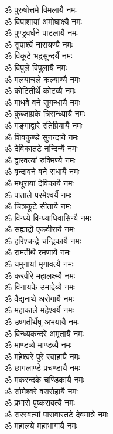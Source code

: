 \begin{multicols}{2}
\begin{flushleft}
ॐ पुरुषोत्तमे विमलायै नमः\\
ॐ विपाशायां अमोघाक्ष्यै नमः\\
ॐ पुण्ड्रवर्धने पाटलायै नमः\\
ॐ सुपार्श्वे नारायण्यै नमः\\
ॐ विकूटे भद्रसुन्दर्यै नमः\hfill{}\\
ॐ विपुले विपुलायै नमः\\
ॐ मलयाचले कल्याण्यै नमः\\
ॐ कोटितीर्थे कोटव्यै नमः\\
ॐ माधवे वने सुगन्धायै नमः\\
ॐ कुब्जाम्रके त्रिसन्ध्यायै नमः\\
ॐ गङ्गाद्वारे रतिप्रियायै नमः\\
ॐ शिवकुण्डे सुनन्दायै नमः\\
ॐ देविकातटे नन्दिन्यै नमः\\
ॐ द्वारवत्यां रुक्मिण्यै नमः\\
ॐ वृन्दावने वने राधायै नमः\hfill{}\\
ॐ मथूरायां देविकायै नमः\\
ॐ पाताले परमेश्वर्यै नमः\\
ॐ चित्रकूटे सीतायै नमः\\
ॐ विन्ध्ये विन्ध्याधिवासिन्यै नमः\\
ॐ सह्याद्रौ एकवीरायै नमः\\
ॐ हरिश्चन्द्रे चन्द्रिकायै नमः\\
ॐ रामतीर्थे रमणायै नमः\\
ॐ यमुनायां मृगावत्यै नमः\\
ॐ करवीरे महालक्ष्म्यै नमः\\
ॐ विनायके उमादेव्यै नमः\hfill{}\\
ॐ वैद्यनाथे अरोगायै नमः\\
ॐ महाकाले महेश्वर्यै नमः\\
ॐ उष्णतीर्थेषु अभयायै नमः\\
ॐ विन्ध्यकन्दरे अमृतायै नमः\\
ॐ माण्डव्ये माण्डव्यै नमः\\
ॐ महेश्वरे पुरे स्वाहायै नमः\\
ॐ छागलाण्डे प्रचण्डायै नमः\\
ॐ मकरन्दके चण्डिकायै नमः\\
ॐ सोमेश्वरे वरारोहायै नमः\\
ॐ प्रभासे पुष्करावत्यै नमः\hfill{}\\
ॐ सरस्वत्यां पारावारतटे देवमात्रे नमः\\
ॐ महालये महाभागायै नमः\\

\end{flushleft}
\end{multicols}
